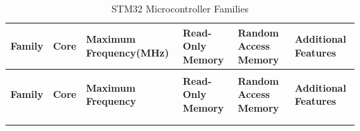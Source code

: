 \begin{xltabular}{\linewidth}{@{}>{\bfseries}l X@{} X@{} X@{} X@{} X@{}}
	\caption{STM32 Microcontroller Families\label{tab:stm32_mcu_families}} \\
	\toprule
	\textbf{Family} & \textbf{Core} & \textbf{Maximum Frequency(MHz)} & \textbf{Read-Only Memory} & \textbf{Random Access Memory} & \textbf{Additional Features} \\
	\midrule
	\endfirsthead %

	 \\
	\toprule
	\textbf{Family} & \textbf{Core} & \textbf{Maximum Frequency} & \textbf{Read-Only Memory} & \textbf{Random Access Memory} & \textbf{Additional Features} \\
	\midrule
	\endhead %

	 \\
	\endfoot %

	\bottomrule
	\endlastfoot %


\end{xltabular}
